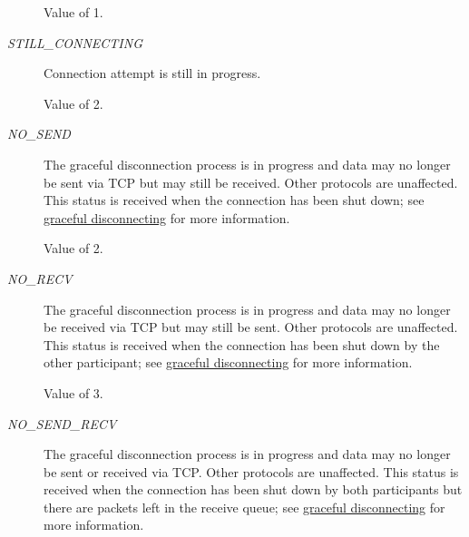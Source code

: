 \begin{Desc}
\begin{description}
 Value of 1. \item[{\em 
\hypertarget{class_net_utility_a7eae52138f8bd597ffc67ebf07e86b6da86caa623f8ffc60da40df3c2ab17532c}{
STILL\_\-CONNECTING}
\label{class_net_utility_a7eae52138f8bd597ffc67ebf07e86b6da86caa623f8ffc60da40df3c2ab17532c}
}]Connection attempt is still in progress. \par
 Value of 2. \item[{\em 
\hypertarget{class_net_utility_a7eae52138f8bd597ffc67ebf07e86b6da1bcc92a56bd754f0e02e33787f7f9e38}{
NO\_\-SEND}
\label{class_net_utility_a7eae52138f8bd597ffc67ebf07e86b6da1bcc92a56bd754f0e02e33787f7f9e38}
}]The graceful disconnection process is in progress and data may no longer be sent via TCP but may still be received. Other protocols are unaffected. This status is received when the connection has been shut down; see \hyperlink{graceful_disconnect_page}{graceful disconnecting} for more information. \par
 Value of 2. \item[{\em 
\hypertarget{class_net_utility_a7eae52138f8bd597ffc67ebf07e86b6dad749d5c33d1f4fda670efe634f651885}{
NO\_\-RECV}
\label{class_net_utility_a7eae52138f8bd597ffc67ebf07e86b6dad749d5c33d1f4fda670efe634f651885}
}]The graceful disconnection process is in progress and data may no longer be received via TCP but may still be sent. Other protocols are unaffected. This status is received when the connection has been shut down by the other participant; see \hyperlink{graceful_disconnect_page}{graceful disconnecting} for more information. \par
 Value of 3. \item[{\em 
\hypertarget{class_net_utility_a7eae52138f8bd597ffc67ebf07e86b6dabfdb16770f1140f86d621739ffe89560}{
NO\_\-SEND\_\-RECV}
\label{class_net_utility_a7eae52138f8bd597ffc67ebf07e86b6dabfdb16770f1140f86d621739ffe89560}
}]The graceful disconnection process is in progress and data may no longer be sent or received via TCP. Other protocols are unaffected. This status is received when the connection has been shut down by both participants but there are packets left in the receive queue; see \hyperlink{graceful_disconnect_page}{graceful disconnecting} for more information. \par

\end{description}
\end{Desc}

